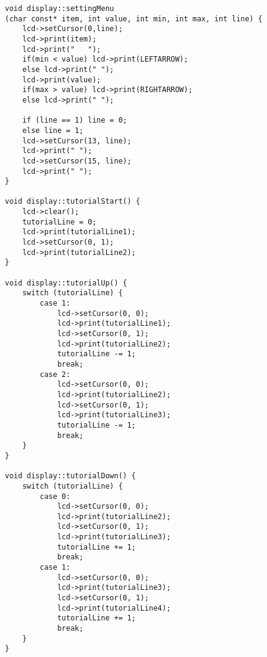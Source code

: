 \begin{verbatim}
void display::settingMenu
(char const* item, int value, int min, int max, int line) {
    lcd->setCursor(0,line);
    lcd->print(item);
    lcd->print("   ");
    if(min < value) lcd->print(LEFTARROW);
    else lcd->print(" ");
    lcd->print(value);
    if(max > value) lcd->print(RIGHTARROW);
    else lcd->print(" ");

    if (line == 1) line = 0;
    else line = 1;
    lcd->setCursor(13, line);
    lcd->print(" ");
    lcd->setCursor(15, line);
    lcd->print(" ");
}

void display::tutorialStart() {
    lcd->clear();
    tutorialLine = 0;
    lcd->print(tutorialLine1);
    lcd->setCursor(0, 1);
    lcd->print(tutorialLine2);
}

void display::tutorialUp() {
    switch (tutorialLine) {
        case 1:
            lcd->setCursor(0, 0);
            lcd->print(tutorialLine1);
            lcd->setCursor(0, 1);
            lcd->print(tutorialLine2);
            tutorialLine -= 1;
            break;
        case 2:
            lcd->setCursor(0, 0);
            lcd->print(tutorialLine2);
            lcd->setCursor(0, 1);
            lcd->print(tutorialLine3);
            tutorialLine -= 1;
            break;      
    }
}

void display::tutorialDown() {
    switch (tutorialLine) {
        case 0:
            lcd->setCursor(0, 0);
            lcd->print(tutorialLine2);
            lcd->setCursor(0, 1);
            lcd->print(tutorialLine3);
            tutorialLine += 1;
            break;
        case 1:
            lcd->setCursor(0, 0);
            lcd->print(tutorialLine3);
            lcd->setCursor(0, 1);
            lcd->print(tutorialLine4);
            tutorialLine += 1;
            break;
    }
}
\end{verbatim}

